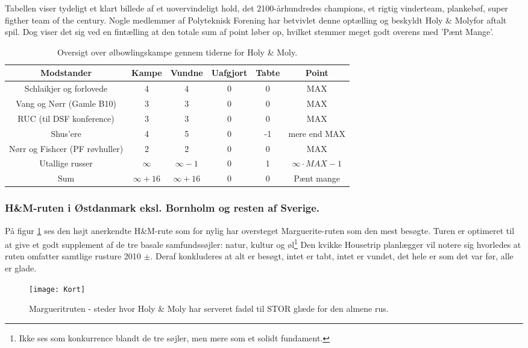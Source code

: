 Tabellen viser tydeligt et klart billede af et uovervindeligt hold, det 2100-århundredes champions, et rigtig vinderteam, plankebøf, super figther team of the century\cite{bib:url:2xThyboe}. Nogle medlemmer af Polyteknisk Forening har betvivlet denne optælling og beskyldt Holy \& Moly\texttrademark for aftalt spil. Dog viser det sig ved en fintælling at den totale sum af point løber op, hvilket stemmer meget godt overens med 'Pænt Mange'.
\begin{table}[h!]
\centering
\begin{tabular}{|c|c|c|c|c|c|} \hline 
Modstander & Kampe & Vundne & Uafgjort & Tabte & Point \\ \hline \hline
Schlaikjer og forlovede & 4 & 4 & 0 & 0 & MAX \\ \hline
Vang og Nørr (Gamle B10) & 3 & 3 & 0 & 0 & MAX \\ \hline
RUC (til DSF konference) & 3 & 3 & 0 & 0 & MAX \\ \hline
Shus'ere & 4 & 5 & 0 & -1 & mere end MAX \\ \hline
Nørr og Fishcer (PF røvhuller) & 2 & 2 & 0 & 0 & MAX \\ \hline
Utallige russer & $\infty $ & $\infty - 1 $ & 0 & 1 & $\infty \cdot MAX -1$ \\ \hline \hline
Sum & $\infty + 16 $ & $\infty + 16$ & 0 & 0 & Pænt mange \\ \hline
\end{tabular}
\caption{Oversigt over ølbowlingskampe gennem tiderne for Holy \& Moly\texttrademark.}
\label{tab:BeerBow}
\end{table}

\subsubsection{H\&M-ruten i Østdanmark eksl. Bornholm og resten af Sverige.}
På figur \ref{fig:Kort} ses den højt anerkendte H\&M-rute som for nylig har oversteget Marguerite-ruten som den mest besøgte\cite{bib:url:Marguerit}. Turen er optimeret til at give et godt supplement af de tre basale samfundssøjler: natur, kultur og øl\footnote{Ikke ses som konkurrence blandt de tre søjler, men mere som et solidt fundament.} Den kvikke Housetrip planlægger vil notere sig hvorledes at ruten omfatter samtlige rusture 2010 $\pm$. Deraf konkluderes at alt er besøgt, intet er tabt, intet er vundet, det hele er som det var før, alle er glade.  

\begin{figure}[h!]
\centering
\texttt{[image: Kort]}
\caption{Margueritruten - steder hvor Holy \& Moly har serveret fadøl til STOR glæde for den almene rus.}
\label{fig:Kort}
\end{figure}

